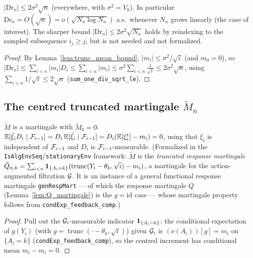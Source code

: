 \begin{lemma}\label{lem:trunc_drift}
\leanok
{}
$|\mathrm{Dr}_n|\le 2\sigma^2\sqrt{n}$ (everywhere, with $\sigma^2=V_k$). In particular
$\mathrm{Dr}_n=O(\sqrt n)=o(\sqrt{N_n\log N_n})$ a.s.\ whenever $N_n$ grows linearly (the case of
interest). The sharper bound $|\mathrm{Dr}_n|\le 2\sigma^2\sqrt{N_n}$ holds by reindexing to the
sampled subsequence $i_j\ge j$, but is not needed and not formalized.
\end{lemma}
\begin{proof}\leanok
{}
By Lemma~\ref{lem:trunc_mean_bound}, $|m_i|\le\sigma^2/\sqrt i$ (and $m_0=0$), so
$|\mathrm{Dr}_n|\le\sum_{i<n}|m_i|D_i\le\sum_{i<n}|m_i|\le\sigma^2\sum_{i<n}\tfrac1{\sqrt i}
\le 2\sigma^2\sqrt n$, using $\sum_{i<n}1/\sqrt i\le 2\sqrt n$
(\texttt{sum\_one\_div\_sqrt\_le}).
\end{proof}

\subsection{The centred truncated martingale $\tilde M_n$}

\begin{lemma}\label{lem:trunc_mart}
\leanok
{}
$\tilde M$ is a martingale with $\tilde M_0=0$: $\mathbb{E}[\tilde\xi_i D_i\mid\mathcal{F}_{i-1}]
=D_i\,\mathbb{E}[\tilde\xi_i\mid\mathcal{F}_{i-1}]=D_i(\mathbb{E}[\xi_i^{\mathrm t}]-m_i)=0$, using that $\xi_i$ is
independent of $\mathcal{F}_{i-1}$ and $D_i$ is $\mathcal{F}_{i-1}$-measurable.
(Formalized in the \texttt{IsAlgEnvSeq}/\texttt{stationaryEnv} framework: $\tilde M$ is the
\emph{truncated response martingale} $\tilde Q_{n,k}=\sum_{i<n}\mathbf{1}_{\{A_i=k\}}
(\operatorname{trunc}(Y_i-\theta_k,\sqrt i)-m_i)$, a martingale for the action-augmented
filtration $\mathcal{G}$. It is an instance of a general functional response martingale
\texttt{genRespMart} --- of which the response martingale $Q$ (Lemma~\ref{lem:Q_martingale}) is the
$g=\mathrm{id}$ case --- whose martingale property follows from \texttt{condExp\_feedback\_comp}.)
\end{lemma}
\begin{proof}\leanok
{}
Pull out the $\mathcal{G}_i$-measurable indicator $\mathbf{1}_{\{A_i=k\}}$; the conditional
expectation of $g(Y_i)$ (with $g=\operatorname{trunc}(\cdot-\theta_k,\sqrt i)$) given
$\mathcal{G}_i$ is $(\nu(A_i))[g]=m_i$ on $\{A_i=k\}$ (\texttt{condExp\_feedback\_comp}), so the
centred increment has conditional mean $m_i-m_i=0$.
\end{proof}

